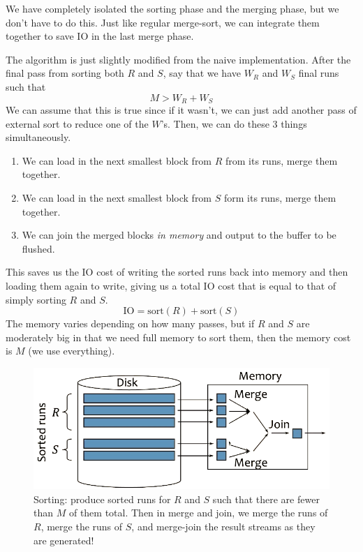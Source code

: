     We have completely isolated the sorting phase and the merging phase, but we don't have to do this. Just like regular merge-sort, we can integrate them together to save IO in the last merge phase. 

    \begin{algo} 
      The algorithm is just slightly modified from the naive implementation. After the final pass from sorting both $R$ and $S$, say that we have $W_R$ and $W_S$ final runs such that 
      \begin{equation}
        M > W_R + W_S
      \end{equation} 
      We can assume that this is true since if it wasn't, we can just add another pass of external sort to reduce one of the $W$'s. Then, we can do these 3 things simultaneously. 
      \begin{enumerate}
        \item We can load in the next smallest block from $R$ from its runs, merge them together.
        \item We can load in the next smallest block from $S$ form its runs, merge them together. 
        \item We can join the merged blocks \textit{in memory} and output to the buffer to be flushed. 
      \end{enumerate}

      This saves us the IO cost of writing the sorted runs back into memory and then loading them again to write, giving us a total IO cost that is equal to that of simply sorting $R$ and $S$. 
      \begin{equation}
        \mathrm{IO} = \mathrm{sort}(R) + \mathrm{sort}(S)
      \end{equation} 
      The memory varies depending on how many passes, but if $R$ and $S$ are moderately big in that we need full memory to sort them, then the memory cost is $M$ (we use everything). 

      \begin{figure}[H]
        \centering 
        \includegraphics[scale=0.4]{img/smj_optim.png}
        \caption{Sorting: produce sorted runs for $R$ and $S$ such that there are fewer than $M$ of them total. Then in merge and join, we merge the runs of $R$, merge the runs of $S$, and merge-join the result streams as they are generated!} 
        \label{fig:smj_optim}
      \end{figure}
    \end{algo}

